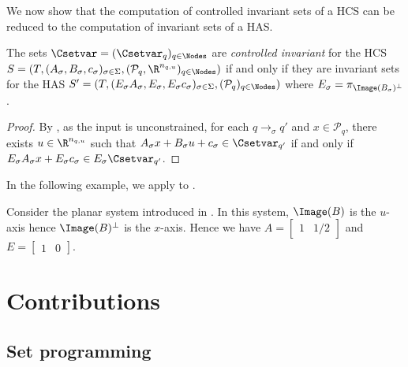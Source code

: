 \documentclass[11pt,twoside,a4paper,openright]{uclouvain-thesis}
\newcommand{\implementations}[1]{}
\newcommand{\tr}{\to}
\newcommand{\trs}[1][\sigma]{\tr_{#1}}
\newcommand{\nqu}{n_{q,u}}
\newcommand{\Ps}{\mathcal{P}}
\newcommand{\sys}{S}
\newcommand{\dtahcs}{HCS}
\newcommand{\dtahas}{HAS}
\begin{document}
We now show that the computation of controlled invariant sets of a \dtahcs{} can be reduced to
the computation of invariant sets of a \dtahas{}.

\begin{myprop}
  \label{prop:proju}
  The sets $\Csetvar = (\Csetvar_q)_{q \in \Nodes}$ are \emph{controlled invariant} for the \dtahcs{}
  $\sys = (T, (A_\sigma, B_\sigma, c_\sigma)_{\sigma \in \Sigma}, (\Ps_q, \R^{\nqu})_{q \in \Nodes})$ if and only if
  they are invariant sets for the \dtahas{}
  $\sys' = (T, (E_\sigma A_\sigma, E_\sigma, E_\sigma c_\sigma)_{\sigma \in \Sigma}, (\Ps_q)_{q \in \Nodes})$
  where $E_\sigma = \pi_{\Image(B_\sigma)^{\perp}}$.

  \begin{proof}
    By , as the input is unconstrained,
    for each $q \trs q'$ and $x \in \Ps_q$,
    there exists $u \in \R^{n_{q,u}}$ such that $A_\sigma x + B_\sigma u + c_\sigma \in \Csetvar_{q'}$ if and only if
    $E_\sigma A_\sigma x + E_\sigma c_\sigma \in E_\sigma \Csetvar_{q'}$.
  \end{proof}
\end{myprop}

In the following example, we apply  to .

\begin{myexem}
  \label{exem:simplecontrol2}
  Consider the planar system introduced in . In this system,
  $\Image(B)$ is the $u$-axis hence $\Image(B)^{\perp}$ is the $x$-axis.
  Hence we have
  \(
    A =
    \begin{bmatrix}
      1 & 1/2
    \end{bmatrix}
  \)
  and
  \(
    E =
    \begin{bmatrix}
      1 & 0
    \end{bmatrix}
  \).
\end{myexem}









\implementations{\jlpkg{SwitchOnSafety}.}





\part{Contributions}

\chapter{Set programming}
\label{chap:setprog}
\end{document}
